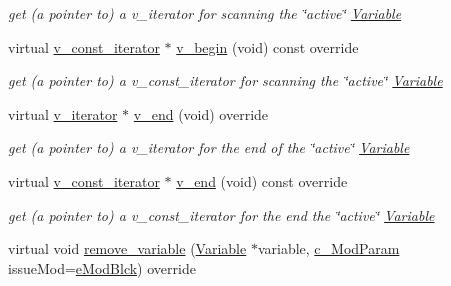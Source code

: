 \begin{Indent}
\begin{DoxyCompactItemize}
\begin{DoxyCompactList}\small\item\em get (a pointer to) a v\+\_\+iterator for scanning the \char`\"{}active\char`\"{} \mbox{\hyperlink{class_s_m_spp__di__unipi__it_1_1_variable}{Variable}} \end{DoxyCompactList}\item 
virtual \mbox{\hyperlink{class_s_m_spp__di__unipi__it_1_1_thin_var_dep_interface_1_1v__const__iterator}{v\+\_\+const\+\_\+iterator}} $\ast$ \mbox{\hyperlink{class_s_m_spp__di__unipi__it_1_1_f_real_objective_a997de10fbae309ac6e357d7ad96a8052}{v\+\_\+begin}} (void) const override
\begin{DoxyCompactList}\small\item\em get (a pointer to) a v\+\_\+const\+\_\+iterator for scanning the \char`\"{}active\char`\"{} \mbox{\hyperlink{class_s_m_spp__di__unipi__it_1_1_variable}{Variable}} \end{DoxyCompactList}\item 
virtual \mbox{\hyperlink{class_s_m_spp__di__unipi__it_1_1_thin_var_dep_interface_1_1v__iterator}{v\+\_\+iterator}} $\ast$ \mbox{\hyperlink{class_s_m_spp__di__unipi__it_1_1_f_real_objective_ad17303c6335cb94a9d32f1fce77501fd}{v\+\_\+end}} (void) override
\begin{DoxyCompactList}\small\item\em get (a pointer to) a v\+\_\+iterator for the end of the \char`\"{}active\char`\"{} \mbox{\hyperlink{class_s_m_spp__di__unipi__it_1_1_variable}{Variable}} \end{DoxyCompactList}\item 
virtual \mbox{\hyperlink{class_s_m_spp__di__unipi__it_1_1_thin_var_dep_interface_1_1v__const__iterator}{v\+\_\+const\+\_\+iterator}} $\ast$ \mbox{\hyperlink{class_s_m_spp__di__unipi__it_1_1_f_real_objective_a17969277c912e791df025c9bebda3217}{v\+\_\+end}} (void) const override
\begin{DoxyCompactList}\small\item\em get (a pointer to) a v\+\_\+const\+\_\+iterator for the end the \char`\"{}active\char`\"{} \mbox{\hyperlink{class_s_m_spp__di__unipi__it_1_1_variable}{Variable}} \end{DoxyCompactList}\item 
virtual void \mbox{\hyperlink{class_s_m_spp__di__unipi__it_1_1_f_real_objective_ade52d9ebf47de895377b860ef4d3a607}{remove\+\_\+variable}} (\mbox{\hyperlink{class_s_m_spp__di__unipi__it_1_1_variable}{Variable}} $\ast$variable, \mbox{\hyperlink{group___modification___t_y_p_e_s_ga544246d8c462e9a2d817c2c30797968f}{c\+\_\+\+Mod\+Param}} issue\+Mod=\mbox{\hyperlink{group___modification___t_y_p_e_s_gga48fddcdd03a03f49b7e389ca1ed938d4a21b14b26b1c0093a0905f6fc010bad29}{e\+Mod\+Blck}}) override

\end{DoxyCompactItemize}
\end{Indent}
